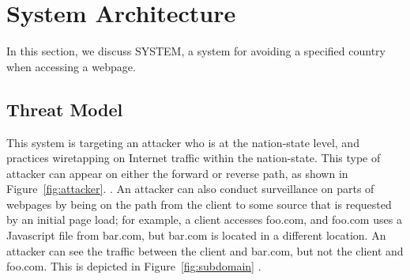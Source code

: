 \section{System Architecture}
\label{architecture}

In this section, we discuss SYSTEM, a system for avoiding a specified country when accessing a webpage.

\subsection{Threat Model}
\label{threat}
This system is targeting an attacker who is at the nation-state level, and practices wiretapping on Internet traffic within the nation-state.  This type of attacker can appear on either the forward or reverse path, as shown in Figure~\ref{fig:attacker}. .  An attacker can also conduct surveillance on parts of webpages by being on the path from the client to some source that is requested by an initial page load; for example, a client accesses foo.com, and foo.com uses a Javascript file from bar.com, but bar.com is located in a different location.  An attacker can see the traffic between the client and bar.com, but not the client and foo.com.  This is depicted in Figure~\ref{fig:subdomain} .

